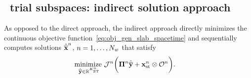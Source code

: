 \subsection{\spaceTimeAcronym\ trial subspaces: indirect solution approach}
As opposed to the direct approach, the indirect approach directly minimizes the continuous objective function~\eqref{eq:obj_gen_slab_spacetime} and sequentially computes solutions $\hat{\mathbf{\overline{x}}}^{n}$, $n = 1,\ldots,N_w$ that satisfy
\begin{equation}\label{eq:obj_gen_slab2}
\begin{split}
 & \underset{\stgenstatey \in \RR{\stdimArg{n}}}{\text{minimize }} \mathcal{J}^n \bigg( \stbasisArgnt{n} \stgenstatey + \stateInterceptSTArg{n} \otimes \onesFunctionArg{n} \bigg) .%
\end{split} 
\end{equation}
